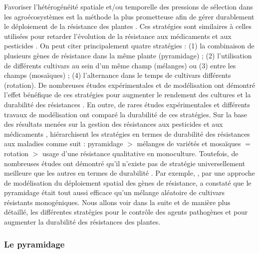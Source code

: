 	Favoriser l'hétérogénéité spatiale et/ou temporelle des pressions de sélection dans les agroécosystèmes est la méthode la plus prometteuse afin de gérer durablement le déploiement de la résistance des plantes \citep{Zhan2015, Brown2015, Bourguet2016}. Ces stratégies sont similaires  à celles utilisées pour retarder l'évolution de la résistance aux médicaments et aux pesticides \citep{Bourguet2016, Consortium2013}.
On peut citer principalement quatre stratégies  :
(1) la combinaison de
plusieurs gènes de résistance dans la même plante (pyramidage) ; (2) l'utilisation de 
différents cultivars au sein d'un même champ (mélanges) ou  (3) entre les champs (mosaïques) ;
(4) l'alternance dans le temps de cultivars différents (rotation).
De nombreuses études expérimentales et de modélisation ont démontré l'effet bénéfique de ces stratégies pour augmenter le  rendement des cultures  et la durabilité des résistances \citep{Fabre2012,  Djian-Caporalino2014, Mundt2014, Fabre2015, Bourguet2016}. En outre, de rares études expérimentales  \citep{Djian-Caporalino2014} et différents travaux de modélisation \citep{Bourguet2016, Lof2017, Rimbaud2018} ont comparé la durabilité de ces stratégies. Sur la base des résultats  menées sur la gestion des résistances aux pesticides et aux médicaments \citep{Consortium2013}, \citet{Bourguet2016} hiérarchisent les stratégies en termes de durabilité des résistances aux maladies comme suit : 
pyramidage $>$ mélanges de variétés et mosaïques  $=$ rotation $>$ usage d'une résistance qualitative en monoculture. Toutefois, de nombreuses études ont démontré qu'il n'existe pas de stratégie universellement meilleure que les autres en termes de durabilité \citep{Rimbaud2018, Fabre2012, Djidjou-Demasse2017}. Par exemple, \citet{Sapoukhina2009}, par une approche de modélisation du déploiement spatial des gènes de résistance, a constaté que le pyramidage était tout aussi efficace qu'un mélange aléatoire de cultivars résistants monogéniques. Nous allons voir dans la suite et de manière plus détaillé, les différentes stratégies pour le contrôle des agents pathogènes et pour augmenter la durabilité des résistances des plantes. 
 
\subsubsection{Le pyramidage} \label{sec:durabilite_pyramidage}

